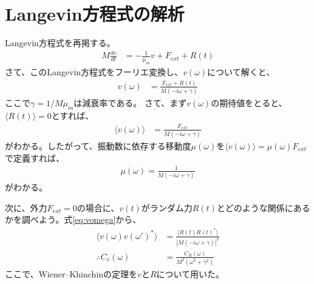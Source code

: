 \documentclass[uplatex,dvipdfmx]{jsarticle}
\begin{document}
\section{Langevin方程式の解析}
Langevin方程式を再掲する。
\begin{align}
    M\frac{dv}{dt} &= -\frac{1}{\mu_m} v + F_{ext} + R(t) \label{eq:langevin}
\end{align}
さて、このLangevin方程式をフーリエ変換し、$v(\omega)$について解くと、
\begin{align}
    v(\omega) &= \frac{F_{ext} + R(t)}{M(-i\omega+\gamma)} \label{eq:vomega}
\end{align}
ここで$\gamma=1/M\mu_m$は減衰率である。
さて、まず$v(\omega)$の期待値をとると、$\langle R(t)\rangle = 0 $とすれば、
\begin{align}
    \langle v(\omega) \rangle &= \frac{F_{ext}}{M(-i\omega+\gamma)} 
\end{align}
がわかる。したがって、振動数に依存する移動度$\mu(\omega)$を$\langle v(\omega) \rangle = \mu(\omega) F_{ext}$で定義すれば、
\begin{align}
    \mu(\omega) = \frac{1}{M(-i\omega+\gamma)} \label{eq:mobility}
\end{align}
がわかる。

次に、外力$F_{ext}=0$の場合に、$v(t)$がランダム力$R(t)$とどのような関係にあるかを調べよう。式\ref{eq:vomega}から、
\begin{align}
    \langle v(\omega)v(\omega')^*\rangle &= \frac{\langle R(t)R(t)^*\rangle}{|M(-i\omega+\gamma)|^2} \\
    \therefore C_v(\omega) &= \frac{C_R(\omega)}{M^2(\omega^2+\gamma^2)}
\end{align}
ここで、Wiener–Khinchinの定理を$vとR$について用いた。
\end{document}
